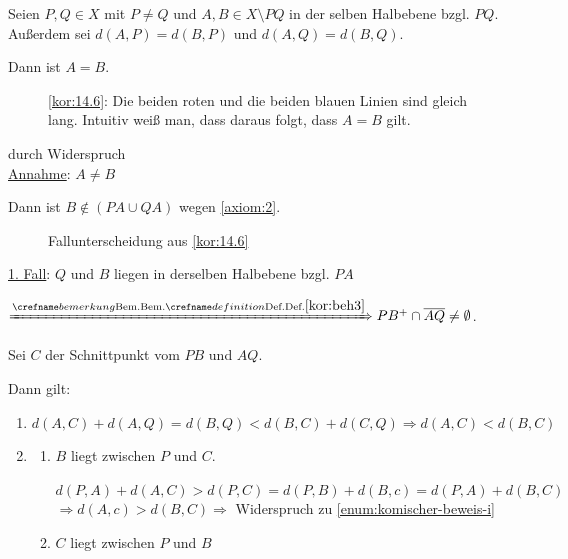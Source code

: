 \begin{bemerkung}\label{kor:14.6}%
    Seien $P, Q \in X$ mit $P \neq Q$ und $A, B \in X \setminus PQ$
    in der selben Halbebene bzgl. $PQ$. Außerdem sei $d(A,P)=d(B,P)$
    und $d(A, Q) = d(B, Q)$.

    Dann ist $A = B$.
\end{bemerkung}

\begin{figure}[htp]
    \centering
    
    \caption{\cref{kor:14.6}: Die beiden roten und die beiden blauen Linien sind gleich lang. Intuitiv weiß man, dass daraus folgt, dass $A = B$ gilt.}
    \label{fig:geometriy-2}
\end{figure}

\begin{beweis} durch Widerspruch\\
    \underline{Annahme}: $A \neq B$

    Dann ist $B \notin (PA \cup QA)$ wegen \ref{axiom:2}.

    \begin{figure}[ht]
        \centering
        \subfloat[1. Fall]{
            
            \label{fig:geometry-3}
        }%
        \subfloat[2. Fall]{
            
            \label{fig:geometry-4}
        }%
        \label{fig:bem:14.6}
        \caption{Fallunterscheidung aus \cref{kor:14.6}}
    \end{figure}

    \underline{1. Fall}: $Q$ und $B$ liegen in derselben Halbebene bzgl. $PA$

    $\xRightarrow{\crefabbr{kor:beh3}} PB^+ \cap \overline{AQ} \neq \emptyset$.

    Sei $C$ der Schnittpunkt vom $PB$ und $AQ$.

    Dann gilt:
    \begin{enumerate}[label=(\roman*)]
        \item $d(A, C) + d(A, Q) = d(B, Q) < d(B, C) + d(C, Q) \Rightarrow d(A, C) < d(B, C)$ \label{enum:komischer-beweis-i}
        \item \begin{enumerate}[label=\alph*)]
                \item $B$ liegt zwischen $P$ und $C$.

                      $d(P,A) + d(A, C) > d(P,C) = d(P,B) + d(B,c) = d(P,A) + d(B,C)$
                      $\Rightarrow d(A,c) > d(B,C) \Rightarrow$ Widerspruch zu \cref{enum:komischer-beweis-i}
                \item $C$ liegt zwischen $P$ und $B$


\end{enumerate}
\end{enumerate}
\end{beweis}

